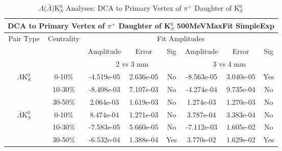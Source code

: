 \documentclass[../AnalysisNoteJBuxton.tex]{subfiles}
\begin{document}
\begin{table}
 \centering
 \begin{tabular}{|c|c|c|c|c||c|c|c|}
  \multicolumn{8}{c}{DCA to Primary Vertex of $\pi^{+}$ Daughter of K$^{0}_{S}$ 500MeVMaxFit SimpleExp} \\
  \hline
  \multirow{3}{*}{Pair Type} & \multirow{3}{*}{Centrality} & \multicolumn{6}{c|}{Fit Amplitudes} \\
  \cline{3-8}
   & & Amplitude & Error & Sig & Amplitude & Error & Sig \\  
  \cline{3-8}
   & & \multicolumn{3}{c||}{2 vs 3 mm} & \multicolumn{3}{c|}{3 vs 4 mm} \\  
  \hline  
  \multirow{3}{*}{$\Lambda$K$^{0}_{S}$}  
   &  0-10\% & -4.519e-05 & 2.636e-05 & No & -8.563e-05 & 3.040e-05 & Yes \\
   & 10-30\% & -8.408e-03 & 7.107e-03 & No & -4.274e-04 & 9.735e-04 & No \\
   & 30-50\% & 2.064e-03 & 1.619e-03 & No & 1.274e-03 & 1.270e-03 & No \\
  \hline  
  \multirow{3}{*}{$\bar{\Lambda}$K$^{0}_{S}$}  
   &  0-10\% & 8.474e-04 & 1.271e-03 & No & 3.787e-04 & 3.383e-04 & No \\
   & 10-30\% & -7.583e-05 & 5.660e-05 & No & -7.112e-03 & 1.605e-02 & No \\
   & 30-50\% & -6.532e-04 & 1.388e-04 & Yes & 3.770e-02 & 1.629e-02 & Yes \\
  \hline
 \end{tabular}
 \caption{$\Lambda$($\bar{\Lambda}$)K$^{0}_{S}$ Analyses: DCA to Primary Vertex of $\pi^{+}$ Daughter of K$^{0}_{S}$}
 \label{tab:DcaToPrimVertexPosPionDaughtOfK0LamK0_500MeVMaxFit_SimpleExp}
\end{table}



\clearpage
\end{document}
